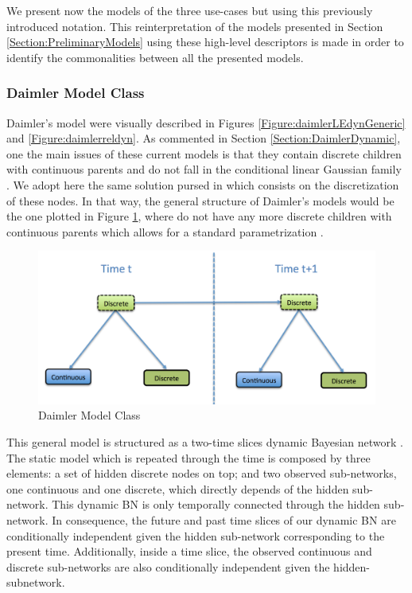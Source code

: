 We present now the models of the three use-cases but using this previously introduced notation. This reinterpretation of the models presented in Section \ref{Section:PreliminaryModels} using these high-level descriptors is made in order to identify the commonalities between all the presented models. 

\subsubsection*{Daimler Model Class}

Daimler's model were visually described in Figures \ref{Figure:daimlerLEdynGeneric}  and \ref{Figure:daimlerreldyn}. As commented in Section \ref{Section:DaimlerDynamic}, one the main issues of these current models is that they contain discrete children with continuous parents and do not fall in the conditional linear Gaussian family \cite{nielsen2009bayesian}. We adopt here the same solution pursed in \cite{kasper2012object} which consists on the discretization of these nodes. In that way, the general structure of Daimler's models would be the one plotted in Figure \ref{Figure:DaimlerModelClass}, where do not have any more discrete children with continuous parents which allows for a standard parametrization \cite{nielsen2009bayesian}. 

\begin{figure}
\begin{center}
\includegraphics[scale=0.4]{./figures/DaimlerModelClass}
\caption{\label{Figure:DaimlerModelClass} Daimler Model Class}
\end{center}
\end{figure}

This general model is structured as a two-time slices dynamic Bayesian network \cite{nielsen2009bayesian}. The static model which is repeated through the time is composed by three elements: a set of hidden discrete nodes on top; and two observed sub-networks, one continuous and one discrete, which directly depends of the hidden sub-network. This dynamic BN is only temporally connected through the hidden sub-network.  In consequence, the future and past time slices of our dynamic BN are conditionally independent given the hidden sub-network corresponding to the present time. Additionally, inside a time slice, the observed continuous and discrete sub-networks are also conditionally independent given the hidden-subnetwork.

